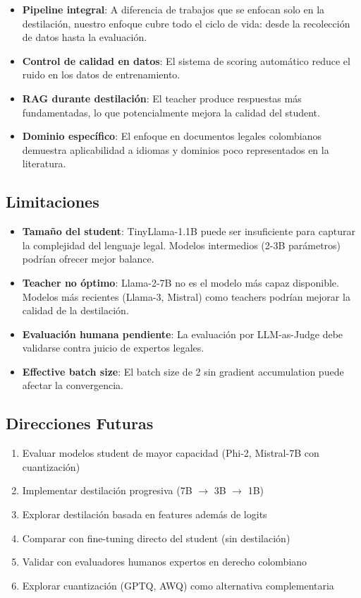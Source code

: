\documentclass[conference]{IEEEtran}
\begin{document}
\begin{itemize}
    \item \textbf{Pipeline integral}: A diferencia de trabajos que se enfocan solo en la destilaci\'on, nuestro enfoque cubre todo el ciclo de vida: desde la recolecci\'on de datos hasta la evaluaci\'on.
    \item \textbf{Control de calidad en datos}: El sistema de scoring autom\'atico reduce el ruido en los datos de entrenamiento.
    \item \textbf{RAG durante destilaci\'on}: El teacher produce respuestas m\'as fundamentadas, lo que potencialmente mejora la calidad del student.
    \item \textbf{Dominio espec\'ifico}: El enfoque en documentos legales colombianos demuestra aplicabilidad a idiomas y dominios poco representados en la literatura.
\end{itemize}

\subsection{Limitaciones}

\begin{itemize}
    \item \textbf{Tama\~no del student}: TinyLlama-1.1B puede ser insuficiente para capturar la complejidad del lenguaje legal. Modelos intermedios (2-3B par\'ametros) podr\'ian ofrecer mejor balance.
    \item \textbf{Teacher no \'optimo}: Llama-2-7B no es el modelo m\'as capaz disponible. Modelos m\'as recientes (Llama-3, Mistral) como teachers podr\'ian mejorar la calidad de la destilaci\'on.
    \item \textbf{Evaluaci\'on humana pendiente}: La evaluaci\'on por LLM-as-Judge debe validarse contra juicio de expertos legales.
    \item \textbf{Effective batch size}: El batch size de 2 sin gradient accumulation puede afectar la convergencia.
\end{itemize}

\subsection{Direcciones Futuras}

\begin{enumerate}
    \item Evaluar modelos student de mayor capacidad (Phi-2, Mistral-7B con cuantizaci\'on)
    \item Implementar destilaci\'on progresiva (7B $\rightarrow$ 3B $\rightarrow$ 1B)
    \item Explorar destilaci\'on basada en features adem\'as de logits
    \item Comparar con fine-tuning directo del student (sin destilaci\'on)
    \item Validar con evaluadores humanos expertos en derecho colombiano
    \item Explorar cuantizaci\'on (GPTQ, AWQ) como alternativa complementaria
\end{enumerate}
\end{document}

